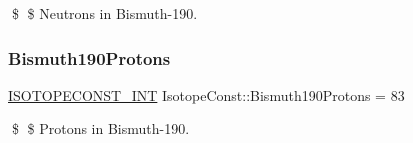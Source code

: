 \$ \$ Neutrons in Bismuth-\/190. \mbox{\label{group___isotope_const-_bismuth-_bi190_ga974d94ffb0c49b19e21c8c240c156034}} 
\subsubsection{\texorpdfstring{Bismuth190\+Protons}{Bismuth190Protons}}
{\footnotesize\ttfamily \mbox{\hyperlink{group___isotope_const-_macros_ga5f18360b3e99483a35c32d789e62621c}{I\+S\+O\+T\+O\+P\+E\+C\+O\+N\+S\+T\+\_\+\+I\+NT}} Isotope\+Const\+::\+Bismuth190\+Protons = 83}

\$ \$ Protons in Bismuth-\/190. 